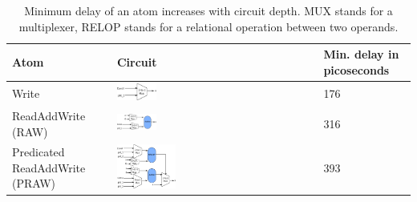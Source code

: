 \begin{table}[!t]
  \begin{scriptsize}
    \begin{tabular}{|p{}|p{}|p{}|}
  \hline
  Atom & Circuit & Min. delay in picoseconds \\
  \hline
  Write & \includegraphics[width=0.2\textwidth]{rw.pdf} & 176 \\
  \hline
  ReadAddWrite (RAW) & \includegraphics[width=0.2\textwidth]{raw.pdf} & 316\\
  \hline
  Predicated ReadAddWrite (PRAW) & \includegraphics[width=0.3\textwidth]{pred_raw.pdf}  & 393 \\
  \hline
  \end{tabular}
\end{scriptsize}
\caption{Minimum delay of an atom increases with circuit depth. MUX
stands for a multiplexer, RELOP stands for a relational operation between two
operands.}
\label{tab:circuits}
\end{table}

